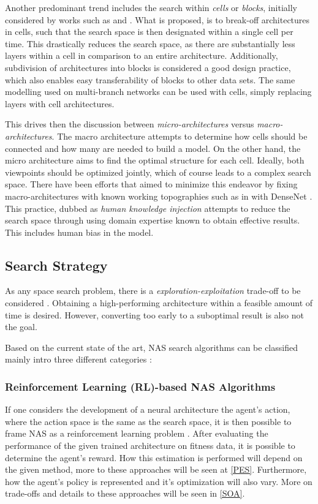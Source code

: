 \documentclass[10pt,        %
               a4paper,     %
               journal,     %
               ]{IEEEtran}
\begin{document}
Another predominant trend includes the search within \textit{cells} or \textit{blocks}, initially considered by works such as
\cite{zhong2018practical} and \cite{zoph2018learning}. What is proposed, is to break-off architectures in cells, such that
the search space is then designated within a single cell per time. This drastically reduces the search space, as there are
substantially less layers within a cell in comparison to an entire architecture. Additionally, subdivision of architectures
into blocks is considered a good design practice, which also enables easy transferability of blocks to other data sets. The same
modelling used on multi-branch networks can be used with cells, simply replacing layers with cell architectures.

This drives then the discussion between \textit{micro-architectures} versus \textit{macro-architectures}. The macro architecture
attempts to determine how cells should be connected and how many are needed to build a model. On the other hand, the micro
architecture aims to find the optimal structure for each cell. Ideally, both viewpoints should be optimized jointly, which of course
leads to a complex search space. There have been efforts that aimed to minimize this endeavor by fixing macro-architectures with
known working topographies such as in \cite{pmlr-v80-cai18a} with DenseNet \cite{Huang_2017_CVPR}. This practice, dubbed as
\textit{human knowledge injection} attempts to reduce the search space through using domain expertise known to obtain
effective results. This includes human bias in the model.

\subsection{Search Strategy}
As any space search problem, there is a \textit{exploration-exploitation} trade-off to be considered \cite{wistuba2019survey}.
Obtaining a high-performing architecture within a feasible amount of time is desired. However, converting too early to a
suboptimal result is also not the goal.

Based on the current state of the art, NAS search algorithms can be classified mainly intro three different
categories \cite{liu2021survey}:

\subsubsection{\textbf{Reinforcement Learning} (RL)-based NAS Algorithms}
If one considers the development of a neural architecture the agent's action, where the action space is the same as
the search space, it is then possible to frame NAS as a reinforcement learning problem \cite{wistuba2019survey}.
After evaluating the performance of the given trained architecture on fitness data, it is possible to
determine the agent's reward. How this estimation is performed will depend on the given method, more to these
approaches will be seen at \ref{PES}. Furthermore, how the agent's policy is represented and it's optimization will
also vary. More on trade-offs and details to these approaches will be seen in \ref{SOA}.
\end{document}
